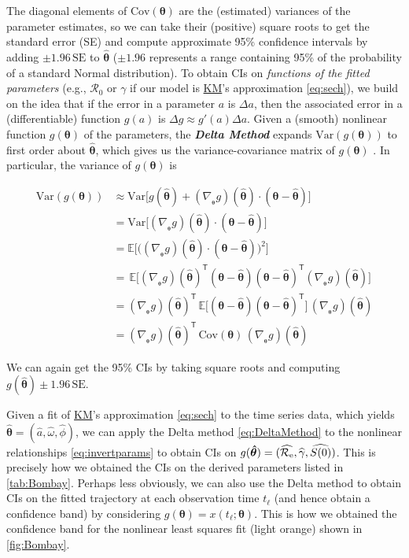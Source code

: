 \documentclass[]{interact}\usepackage[]{graphicx}\usepackage[]{xcolor}
\theoremstyle{plain}%
\theoremstyle{definition}
\theoremstyle{remark}
\newcommand{\term}[1]{{\bfseries\slshape#1}}
\newcommand{\R}{{\mathcal R}}
\newcommand{\Rn}{\R_0}
\newcommand{\Reff}{\R_{\rm e}}
\newcommand{\KM}{\protect\hyperlink{cite.KermMcKe27}{KM}\xspace}
\newcommand{\thetavec}{{\bm{\theta}}}
\newcommand{\thetavechat}{{\bm{\hat\theta}}}
\newcommand{\gradtheta}{\nabla_{{}_{\!\!\thetavec}}}
\newcommand{\nlscol}{orange\xspace}  %
\newcommand{\transpose}{{\textsf{T}}}
\newcommand{\traj}{x}
\newcommand{\tindex}{{\ell}}
\newcommand{\ti}{t_\tindex}
\newcommand{\Sinit}{S(0)}
\begin{document}
\hypertarget{DeltaMethod}{} The diagonal elements of
$\mathrm{Cov}(\thetavec)$ are the (estimated) variances of the
parameter estimates, so we can take their (positive) square roots to
get the standard error (SE) and compute approximate 95\% confidence
intervals by adding $\pm1.96\,\mathrm{SE}$ to $\thetavechat$
($\pm 1.96$ represents a range containing 95\% of the probability of a
standard Normal distribution).  To obtain CIs on \emph{functions of the
fitted parameters} (e.g., $\Rn$ or $\gamma$ if our model is \KM's
approximation \eqref{eq:sech}), we build on the idea that if the error
in a parameter $a$ is $\Delta a$, then the associated error in a
(differentiable) function $g(a)$ is $\Delta{g}\approx g'(a)\Delta{a}$.
Given a (smooth) nonlinear function $g(\thetavec)$ of the parameters,
the \term{Delta Method} \citep{Dorf38,VerH12} expands
$\textrm{Var}(g(\thetavec))$ to first order about $\thetavechat$,
which gives us the variance-covariance matrix of $g(\thetavec)$
\citep[\S7.5.2]{Bolk08} \citep[\S9.9]{Wassermanall2010}.  In
particular, the variance of $g(\thetavec)$ is
\begin{linenomath*}
\begin{subequations}\label{eq:DeltaMethod}
\begin{align}
\mathrm{Var}(g(\thetavec))
&\approx
\mathrm{Var}\big[g(\thetavechat)
   + (\gradtheta g)(\thetavechat)\cdot(\thetavec-\thetavechat)\big] \\
&=
\mathrm{Var}\big[(\gradtheta g)(\thetavechat)\cdot(\thetavec-\thetavechat)\big] \\
&=
\mathbb{E}\big[\big((\gradtheta g)(\thetavechat)\cdot(\thetavec-\thetavechat)\big)^2\big] \\
&=
\,\mathbb{E}\big[
(\gradtheta g)(\thetavechat)^\transpose
  (\thetavec-\thetavechat)
  (\thetavec-\thetavechat)^\transpose
  (\gradtheta g)(\thetavechat)
  \big]\,
\\
&=
(\gradtheta g)(\thetavechat)^\transpose
\,\mathbb{E}\big[
  (\thetavec-\thetavechat)
  (\thetavec-\thetavechat)^\transpose
  \big]\,
(\gradtheta g)(\thetavechat) \\
&=
(\gradtheta g)(\thetavechat)^\transpose
\,\textrm{Cov}(\thetavec)\,
(\gradtheta g)(\thetavechat)
\end{align}
\end{subequations}
\end{linenomath*}
We can again get the 95\% CIs by taking square roots and computing
$g(\thetavechat) \pm1.96\,\mathrm{SE}$.

Given a fit of \KM's approximation \eqref{eq:sech} to the time series
data, which yields $\thetavechat=(\hat{a},\hat{\omega},\hat{\phi})$,
we can apply the Delta method \eqref{eq:DeltaMethod} to the nonlinear
relationships \eqref{eq:invertparams} to obtain CIs on
$g(\thetavechat)=(\widehat{\Reff},
\widehat{\gamma},\widehat{\Sinit})$.  This is precisely how we
obtained the CIs on the derived parameters listed in
\cref{tab:Bombay}.  Perhaps less obviously, we can also use the Delta
method to obtain CIs on the fitted trajectory at each observation time
$\ti$ (and hence obtain a confidence band) by considering
$g(\thetavec)=\traj(\ti;\thetavec)$.  This is how we obtained the
confidence band for the nonlinear least squares fit (light \nlscol)
shown in \cref{fig:Bombay}.
\end{document}

